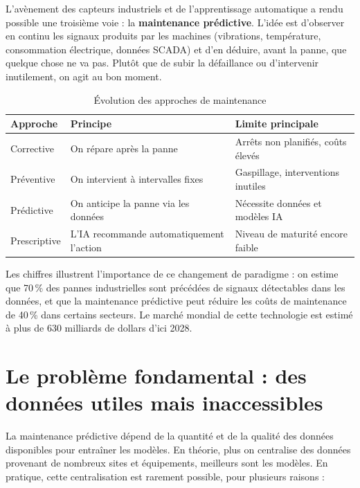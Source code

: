 \documentclass[12pt, a4paper]{report}
\begin{document}
L'avènement des capteurs industriels et de l'apprentissage automatique a rendu possible
une troisième voie : la \textbf{maintenance prédictive}. L'idée est d'observer en
continu les signaux produits par les machines (vibrations, température, consommation
électrique, données SCADA) et d'en déduire, avant la panne, que quelque chose ne va pas.
Plutôt que de subir la défaillance ou d'intervenir inutilement, on agit au bon moment.

\begin{table}[h!]
\centering
\caption{Évolution des approches de maintenance}
\label{tab:maintenance-evolution}
\renewcommand{\arraystretch}{1.5}
\begin{tabularx}{\textwidth}{lXX}
\toprule
Approche & Principe & Limite principale \\
\midrule
Corrective & On répare après la panne & Arrêts non planifiés, coûts élevés \\
Préventive & On intervient à intervalles fixes & Gaspillage, interventions inutiles \\
Prédictive & On anticipe la panne via les données & Nécessite données et modèles IA \\
Prescriptive & L'IA recommande automatiquement l'action & Niveau de maturité encore faible \\
\bottomrule
\end{tabularx}
\end{table}

Les chiffres illustrent l'importance de ce changement de paradigme : on estime que
70\,\% des pannes industrielles sont précédées de signaux détectables dans les données,
et que la maintenance prédictive peut réduire les coûts de maintenance de 40\,\% dans
certains secteurs. Le marché mondial de cette technologie est estimé à plus de 630
milliards de dollars d'ici 2028.

\section{Le problème fondamental : des données utiles mais inaccessibles}

La maintenance prédictive dépend de la quantité et de la qualité des données
disponibles pour entraîner les modèles. En théorie, plus on centralise des données
provenant de nombreux sites et équipements, meilleurs sont les modèles. En pratique,
cette centralisation est rarement possible, pour plusieurs raisons :
\end{document}
